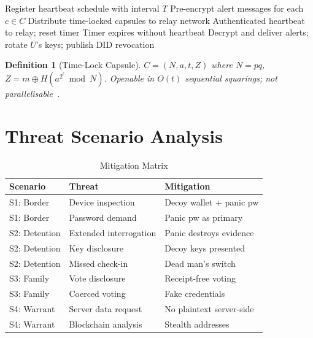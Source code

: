\documentclass[11pt,a4paper]{article}
\newtheorem{definition}{Definition}[section]
\begin{document}
\begin{algorithm}[H]
\caption{Dead Man's Switch}
\label{alg:dead-man}
\begin{algorithmic}[1]
    \State Register heartbeat schedule with interval $T$
    \State Pre-encrypt alert messages for each $c \in C$
    \State Distribute time-locked capsules to relay network
\EndProcedure
{}
    \State Authenticated heartbeat to relay; reset timer
\EndProcedure
{}
    \State Timer expires without heartbeat
    \State Decrypt and deliver alerts; rotate $U$'s keys;
    publish DID revocation
\EndProcedure
\end{algorithmic}
\end{algorithm}

\begin{definition}[Time-Lock Capsule]
    $C = (N, a, t, Z)$ where $N = pq$, $Z = m \oplus H(a^{2^t} \bmod N)$.
    Openable in $O(t)$ sequential squarings; not
    parallelisable~\cite{rivest1996time}.
\end{definition}

\section{Threat Scenario Analysis}
\label{sec:analysis}

\begin{table}[h]
\centering
\caption{Mitigation Matrix}
\label{tab:mitigation}
\begin{tabular}{@{}lll@{}}
\toprule
\textbf{Scenario} & \textbf{Threat} & \textbf{Mitigation} \\
\midrule
S1: Border    & Device inspection    & Decoy wallet + panic pw \\
S1: Border    & Password demand      & Panic pw as primary \\
S2: Detention & Extended interrogation & Panic destroys evidence \\
S2: Detention & Key disclosure       & Decoy keys presented \\
S2: Detention & Missed check-in      & Dead man's switch \\
S3: Family    & Vote disclosure      & Receipt-free voting \\
S3: Family    & Coerced voting       & Fake credentials \\
S4: Warrant   & Server data request  & No plaintext server-side \\
S4: Warrant   & Blockchain analysis  & Stealth addresses \\
\bottomrule
\end{tabular}
\end{table}
\end{document}
